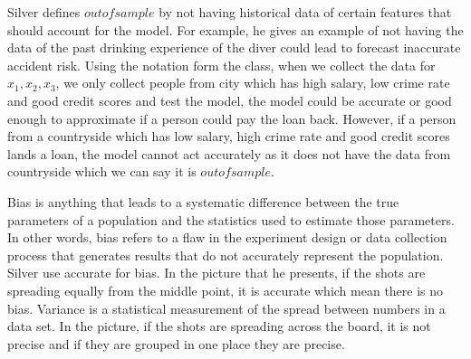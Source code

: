 \documentclass[12pt]{article}
\begin{document}
\begin{enumerate}
Silver defines $out of sample$ by not having historical data of certain features that should account for the model. For example, he gives an example of not having the data of the past drinking experience of the diver could lead to forecast inaccurate accident risk. Using the notation form the class, when we collect the data for $x_1, x_2, x_3$, we only collect people from city which has high salary, low crime rate and good credit scores and test the model, the model could be accurate or good enough to approximate if a person could pay the loan back. However, if a person from a countryside  which has low salary, high crime rate and good credit scores lands a loan, the model cannot act accurately as it does not have the data from countryside which we can say it is $out of sample$.


Bias is anything that leads to a systematic difference between the true parameters of a population and the statistics used to estimate those parameters. In other words, bias refers to a flaw in the experiment design or data collection process that generates results that do not accurately represent the population. Silver use accurate for bias. In the picture that he presents, if the shots are spreading equally from the middle point, it is accurate which mean there is no bias. Variance is a statistical measurement of the spread between numbers in a data set. In the picture, if the shots are spreading across the board, it is not precise and if they are grouped in one place they are precise.

\end{enumerate}



\end{document}

